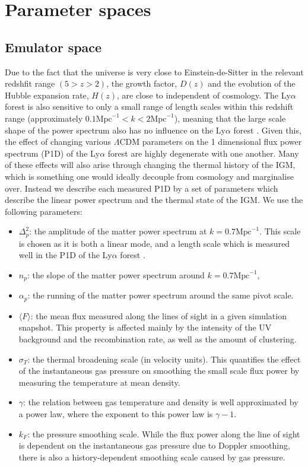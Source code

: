 \documentclass[]{article}
\newcommand{\lyaf}{Ly$\alpha$ forest }                     %
\begin{document}
\section{Parameter spaces}
\subsection{Emulator space}
Due to the fact that the universe is very close to Einstein-de-Sitter in the relevant 
redshfit range $(5>z>2)$, the growth factor, $D(z)$ and the evolution of the Hubble 
expansion rate, $H(z)$, are close to independent of cosmology. The \lyaf is also 
sensitive to only a small range of length scales within this redshift range 
(approximately $0.1 \mathrm{Mpc}^{-1} < k < 2 \mathrm{Mpc}^{-1}$), meaning that the large 
scale shape of the power spectrum also has no influence on the \lyaf. Given this, the 
effect of changing various $\Lambda$CDM parameters on the 1 dimensional flux power 
spectrum (P1D) of the \lyaf are highly degenerate with one another. Many of these effects 
will also arise through changing the thermal history of the IGM, which is something one 
would ideally decouple from cosmology and marginalise over. Instead we describe each 
measured P1D by a set of parameters which describe the linear power spectrum and the 
thermal state of the IGM. We use the following parameters:

\begin{itemize}
    \item $\Delta^2_p$: the amplitude of the matter power spectrum at $k=0.7 \mathrm{Mpc}^
    {-1}$. This scale is chosen as it is both a linear mode, and a length scale which is 
    measured well in the P1D of the \lyaf.
    \item $n_p$: the slope of the matter power spectrum around $k=0.7 \mathrm{Mpc}^{-1}$,
    \item $\alpha_p$: the running of the matter power spectrum around the same pivot 
    scale.
    \item $\langle F\rangle$: the mean flux measured along the lines of sight in
     a given simulation snapshot. 
    This property is affected mainly by the intensity of the UV background and the 
    recombination rate, as well as the amount of clustering.
    \item $\sigma_T$: the thermal broadening scale (in velocity units). This quantifies 
    the effect of the instantaneous gas pressure on smoothing the small scale flux power 
    by measuring the temperature at mean density.
    \item $\gamma$: the relation between gas temperature and density is well
    approximated by a power law, where the exponent to this power law is $\gamma-1$.
    \item $k_F$: the pressure smoothing scale. While the flux power along the line of 
    sight is dependent on the instantaneous gas pressure due to Doppler smoothing, there 
    is also a history-dependent smoothing scale caused by gas pressure\cite{Hui1997}\cite{Gnedin1998}.
\end{itemize}
\end{document}
